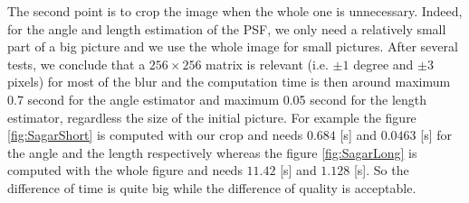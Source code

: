 The second point is to crop the image when the whole one is unnecessary. Indeed, for the angle and length estimation of the PSF, we only need a relatively small part of a big picture and we  use the whole image for small pictures. After several tests, we conclude that a $256 \times 256 $ matrix is relevant (i.e. $\pm 1$ degree and $\pm 3$ pixels) for most of the blur and the computation time is then around maximum 0.7 second for the angle estimator and maximum 0.05 second for the length estimator, regardless the size of the initial picture. For example the figure \ref{fig:SagarShort} is computed with our crop and needs $0.684 $ [s] and $0.0463$ [s] for the angle and the length respectively whereas the figure \ref{fig:SagarLong} is computed with the whole figure and needs $11.42$ [s] and $1.128$ [s]. So the difference of time is quite big while the difference of quality is acceptable.
